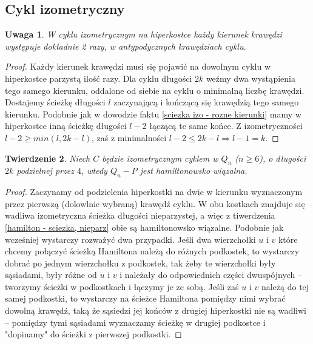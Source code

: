 \documentclass{pracamgr}
\newtheorem{theorem}{Twierdzenie}
\newtheorem{remark}[theorem]{Uwaga}
\begin{document}
   \subsection{Cykl izometryczny}
    \begin{remark}\label{cykl izometryczny - drugie pol powtorka}
     W cyklu izometrycznym na hiperkostce każdy kierunek krawędzi występuje dokładnie 2 razy, w antypodycznych krawędziach cyklu.
    \end{remark}
    \begin{proof}
     Każdy kierunek krawędzi musi się pojawić na dowolnym cyklu w hiperkostce parzystą ilość razy. Dla cyklu długości $2k$
     weźmy dwa wystąpienia tego samego kierunku, oddalone od siebie na cyklu o minimalną liczbę krawędzi. Dostajemy ścieżkę długości $l$ zaczynającą
     i kończącą się krawędzią tego samego kierunku. Podobnie jak w dowodzie faktu \ref{sciezka izo - rozne kierunki} mamy w hiperkostce
     inną ścieżkę długości $l-2$ łączącą te same końce. Z izometryczności $l-2\ge min(l,2k-l)$, zaś z minimalności $l-2\le 2k-l\Rightarrow l-1=k$.
    \end{proof}
    \begin{theorem}\label{hamilton - cykl, parz}
     Niech $C$ będzie izometrycznym cyklem w $Q_n$ ($n\ge6$), o długości $2k$ podzielnej przez $4$, wtedy $Q_n-P$ jest hamiltonowsko wiązalna.
    \end{theorem}
    \begin{proof}
     Zaczynamy od podzielenia hiperkostki na dwie w kierunku wyznaczonym przez pierwszą (dolowlnie wybraną) krawędź cyklu.
     W obu kostkach znajduje się wadliwa izometryczna ścieżka długości nieparzystej, a więc z tiwerdzenia \ref{hamilton - sciezka, nieparz}
     obie są hamiltonowsko wiązalne. Podobnie jak wcześniej wystarczy rozważyć dwa przypadki. Jeśli dwa wierzchołki $u$ i $v$
     które chcemy połączyć ścieżką Hamiltona należą do różnych podkostek,
     to wystarczy dobrać po jednym wierzchołku z podkostek, tak żeby te wierzchołki były sąsiadami, były różne od $u$ i $v$ i należały do odpowiednich
     części dwuspójnych -- tworzymy ścieżki w podkostkach i łączymy je ze sobą. Jeśli zaś $u$ i $v$ należą do tej samej podkostki,
     to wystarczy na ścieżce Hamiltona pomiędzy nimi wybrać dowolną krawędź, taką że sąsiedzi jej końców z drugiej hiperkostki nie są wadliwi --
     pomiędzy tymi sąsiadami wyznaczamy ścieżkę w drugiej podkostce i "dopinamy" do ścieżki z pierwszej podkostki.
    \end{proof}
\end{document}
